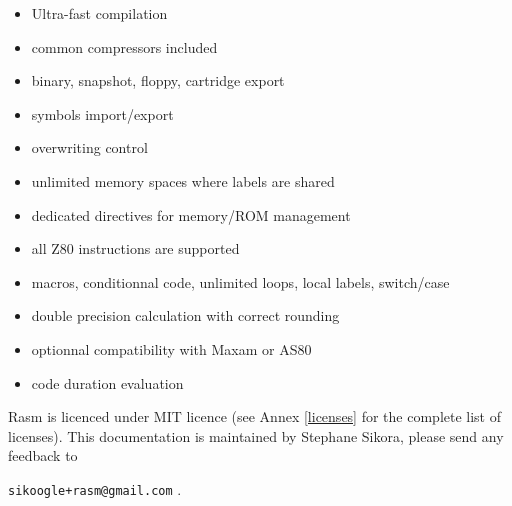 \begin{xen}
\begin{itemize}[noitemsep]
\item Ultra-fast compilation
\item common compressors included
\item binary, snapshot, floppy, cartridge export
\item symbols import/export
\item overwriting control
\item unlimited memory spaces where labels are shared
\item dedicated directives for memory/ROM management
\item all Z80 instructions are supported
\item macros, conditionnal code, unlimited loops, local labels, switch/case
\item double precision calculation with correct rounding
\item optionnal compatibility with Maxam or AS80
\item code duration evaluation
\end{itemize}

Rasm is licenced under MIT licence (see Annex \ref{licenses} for the complete list of licenses).
\medbreak
This documentation is maintained by Stephane Sikora, please send any feedback to

\texttt{sikoogle+rasm@gmail.com} .

\end{xen}

